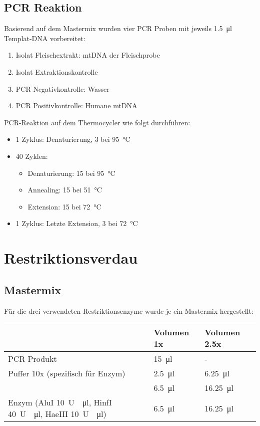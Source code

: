 \documentclass[a4paper,english]{scrreprt}
\begin{document}
\subsection{PCR Reaktion}

Basierend auf dem Mastermix wurden vier PCR Proben mit jeweils \SI{1.5}{\ul}
Templat-DNA vorbereitet:
\begin{enumerate}
	\item Isolat Fleischextrakt: mtDNA der Fleischprobe
	\item Isolat Extraktionskontrolle
	\item PCR Negativkontrolle: Wasser
	\item PCR Positivkontrolle: Humane mtDNA
\end{enumerate}

PCR-Reaktion auf dem Thermocycler wie folgt durchführen:

\begin{itemize}
	\item 1 Zyklus: Denaturierung, \SI{3}{\min} bei \SI{95}{\celsius}
	\item 40 Zyklen:
		\begin{itemize}
			\item Denaturierung: \SI{15}{\sec} bei \SI{95}{\celsius}
			\item Annealing: \SI{15}{\sec} bei \SI{51}{\celsius}
			\item Extension: \SI{15}{\sec} bei \SI{72}{\celsius}
		\end{itemize}
	\item 1 Zyklus: Letzte Extension, \SI{3}{\min} bei \SI{72}{\celsius}
\end{itemize}

\section{Restriktionsverdau}

\subsection{Mastermix}

Für die drei verwendeten Restriktionsenzyme wurde je ein Mastermix hergestellt:
\\

\begin{tabu}{lll}
	\toprule
	& Volumen 1x & Volumen 2.5x \\
	\midrule
	PCR Produkt & \SI{15}{\ul}  & - \\
	Puffer 10x (spezifisch für Enzym)  & \SI{2.5}{\ul} & \SI{6.25}{\ul} \\
	    & \SI{6.5}{\ul} & \SI{16.25}{\ul} \\
	Enzym (AluI \SI{10}{U \per \ul}, HinfI \SI{40}{U \per \ul}, HaeIII \SI{10}{U \per \ul})  & \SI{6.5}{\ul} & \SI{16.25}{\ul} \\
	\bottomrule
\end{tabu}
\\
\end{document}
